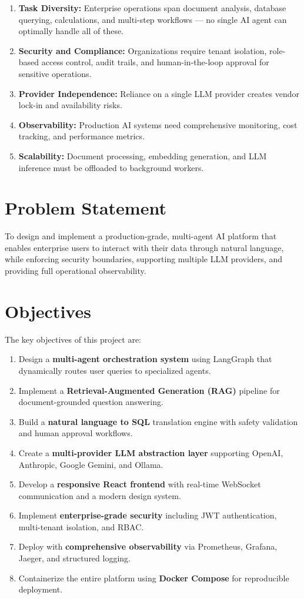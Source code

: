 \documentclass[12pt, a4paper]{report}
\begin{document}
\begin{enumerate}
    \item \textbf{Task Diversity:} Enterprise operations span document analysis, database querying, calculations, and multi-step workflows — no single AI agent can optimally handle all of these.
    \item \textbf{Security and Compliance:} Organizations require tenant isolation, role-based access control, audit trails, and human-in-the-loop approval for sensitive operations.
    \item \textbf{Provider Independence:} Reliance on a single LLM provider creates vendor lock-in and availability risks.
    \item \textbf{Observability:} Production AI systems need comprehensive monitoring, cost tracking, and performance metrics.
    \item \textbf{Scalability:} Document processing, embedding generation, and LLM inference must be offloaded to background workers.
\end{enumerate}

\section{Problem Statement}

To design and implement a production-grade, multi-agent AI platform that enables enterprise users to interact with their data through natural language, while enforcing security boundaries, supporting multiple LLM providers, and providing full operational observability.

\section{Objectives}

The key objectives of this project are:

\begin{enumerate}
    \item Design a \textbf{multi-agent orchestration system} using LangGraph that dynamically routes user queries to specialized agents.
    \item Implement a \textbf{Retrieval-Augmented Generation (RAG)} pipeline for document-grounded question answering.
    \item Build a \textbf{natural language to SQL} translation engine with safety validation and human approval workflows.
    \item Create a \textbf{multi-provider LLM abstraction layer} supporting OpenAI, Anthropic, Google Gemini, and Ollama.
    \item Develop a \textbf{responsive React frontend} with real-time WebSocket communication and a modern design system.
    \item Implement \textbf{enterprise-grade security} including JWT authentication, multi-tenant isolation, and RBAC.
    \item Deploy with \textbf{comprehensive observability} via Prometheus, Grafana, Jaeger, and structured logging.
    \item Containerize the entire platform using \textbf{Docker Compose} for reproducible deployment.
\end{enumerate}
\end{document}
